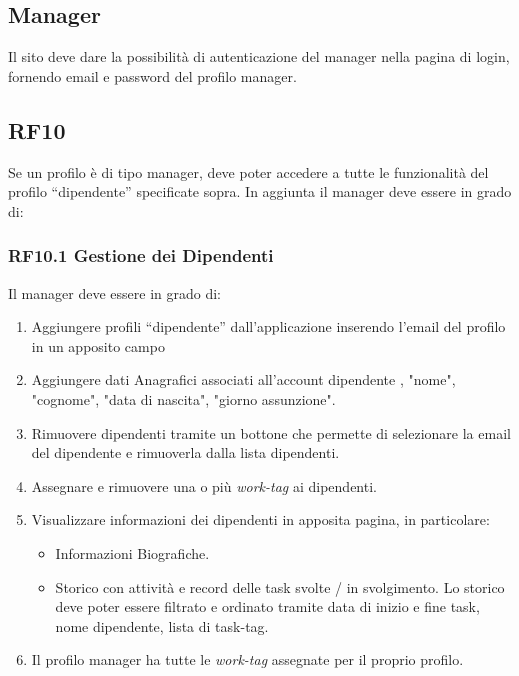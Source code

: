 \documentclass{report}
\begin{document}
\subsection{Manager}
Il sito deve dare la possibilità di autenticazione del manager nella pagina di login, fornendo email e password del profilo manager.

\subsection*{RF10}
Se un profilo è di tipo manager, deve poter accedere a tutte le funzionalità del profilo “dipendente” specificate sopra. In aggiunta il manager deve essere in grado di:

\subsubsection*{RF10.1 Gestione dei Dipendenti}
Il manager deve essere in grado di:

\begin{enumerate}
	
	\item Aggiungere profili “dipendente” dall’applicazione inserendo l’email del profilo in un apposito campo
	\item Aggiungere dati Anagrafici associati all'account dipendente , "nome", "cognome", "data di nascita", "giorno assunzione".
	\item Rimuovere dipendenti tramite un bottone che permette di selezionare la 
	email del dipendente e rimuoverla dalla lista dipendenti.
	
	\item Assegnare e rimuovere una o più \textit{work-tag} ai dipendenti. 
	
	\item Visualizzare informazioni dei dipendenti in apposita pagina, in particolare:
	
	\begin{itemize}
		\item Informazioni Biografiche.
		\item Storico con attività e record delle task svolte / in svolgimento. Lo storico deve poter essere filtrato e ordinato tramite data di inizio e fine task, nome dipendente, lista di task-tag.
		
	\end{itemize}
	
	\item Il profilo manager ha tutte le \textit{work-tag} assegnate per il proprio profilo.
		
\end{enumerate}
\end{document}

